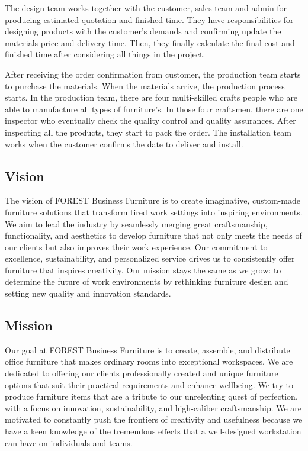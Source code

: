 The design team works together with the customer, sales team and admin for producing estimated quotation and finished time. 
They have responsibilities
for designing products with the customer's demands and confirming update the materials
price and delivery time. Then, they finally calculate the final cost and finished time after
considering all things in the project.


After receiving the order confirmation from customer, the production team starts to
purchase the materials. When the materials arrive, the production process starts. In the
production team, there are four multi-skilled crafts people who are able to manufacture all
types of furniture's. In those four craftsmen, there are one inspector who eventually check
the quality control and quality assurances. After inspecting all the products, they start to
pack the order. The installation team works when the customer confirms the date to deliver
and install.
\newpage
\subsection{Vision}
The vision of FOREST Business Furniture is to create imaginative, custom-made furniture solutions that transform tired work settings into inspiring environments. We aim to lead the industry by seamlessly merging great craftsmanship, functionality, and aesthetics to develop furniture that not only meets the needs of our clients but also improves their work experience. Our commitment to excellence, sustainability, and personalized service drives us to consistently offer furniture that inspires creativity. Our mission stays the same as we grow: to determine the future of work environments by rethinking furniture design and setting new quality and innovation standards.
\subsection{Mission}
Our goal at FOREST Business Furniture is to create, assemble, and distribute office furniture that makes ordinary rooms into exceptional workspaces. We are dedicated to offering our clients professionally created and unique furniture options that suit their practical requirements and enhance wellbeing. We try to produce furniture items that are a tribute to our unrelenting quest of perfection, with a focus on innovation, sustainability, and high-caliber craftsmanship. We are motivated to constantly push the frontiers of creativity and usefulness because we have a keen knowledge of the tremendous effects that a well-designed workstation can have on individuals and teams.
\newpage
